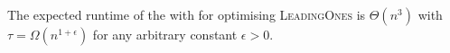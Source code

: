 %
\begin{theorem}\label{thm:FBleadingones}
The expected runtime of the   %
with {\linHD }  for optimising
\textsc{LeadingOnes} is $\Theta(n^3)$ with $\tau=\Omega(n^{1+\epsilon})$ for any arbitrary
constant $\epsilon>0$.
\end{theorem}
